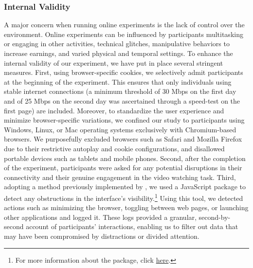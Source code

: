\documentclass[11pt,a4paper,oneside]{article}
\begin{document}


\subsubsection{Internal Validity}\label{int-val}
 
A major concern when running online experiments is the lack of control over the environment. Online experiments can be influenced by participants multitasking or engaging in other activities, technical glitches, manipulative behaviors to increase earnings, and varied  physical and temporal settings. To enhance the internal validity of our experiment, we have put in place several stringent measures. First, using browser-specific cookies, we selectively admit participants at the beginning of the experiment. This ensures that only individuals using stable internet connections (a minimum threshold of 30 Mbps on the first day and of 25 Mbps on the second day was ascertained through a speed-test on the first page) are included. Moreover, to standardize the user experience and minimize browser-specific variations, we confined our study to participants using Windows, Linux, or Mac operating systems exclusively with Chromium-based browsers. We purposefully excluded browsers such as Safari and Mozilla Firefox due to their restrictive autoplay and cookie configurations, and disallowed portable devices such as tablets and mobile phones. Second, after the completion of the experiment, participants were asked for any potential disruptions in their connectivity and their genuine engagement in the video watching task. Third, adopting a method previously implemented by \citet{purohit2023starving}, we used a JavaScript package to detect any obstructions in the interface's visibility.\footnote{For more information about the package, click  \href{https://developer.mozilla.org/en-US/docs/Web/API/Intersection_Observer_API}{here}.} Using this tool, we detected actions such as minimizing the browser, toggling between web pages, or launching other applications and logged it. These logs provided a granular, second-by-second account of participants' interactions, enabling us to filter out data that may have been compromised by distractions or divided attention.
\end{document}
